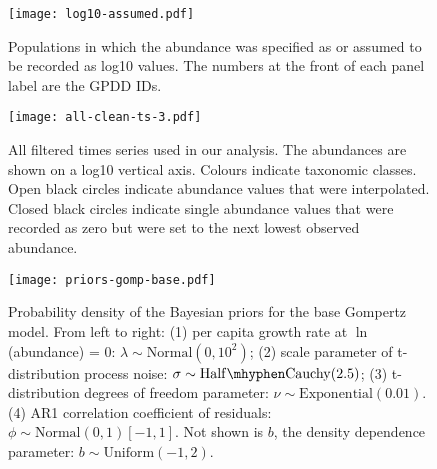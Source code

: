 \documentclass[12pt]{article}
\begin{document}

\renewcommand{\thetable}{S\arabic{table}}
\setcounter{table}{0}



\renewcommand{\thefigure}{S\arabic{figure}}
\setcounter{figure}{0}

\begin{figure}[htbp]
\begin{center}
\texttt{[image: log10-assumed.pdf]} \caption{Populations in which the abundance was specified as or assumed to be recorded as log10 values. The numbers at the front of each panel label are the GPDD IDs.}
    \label{fig:log10-assumed}
\end{center}
\end{figure}

\begin{figure}[htbp]
\begin{center}
\texttt{[image: all-clean-ts-3.pdf]} \caption{All filtered times series used in our analysis. The abundances are shown on a log10 vertical axis. Colours indicate taxonomic classes. Open black circles indicate abundance values that were interpolated. Closed black circles indicate single abundance values that were recorded as zero but were set to the next lowest observed abundance.}
    \label{fig:all-ts}
\end{center}
\end{figure}

\clearpage

\begin{figure}[htbp]
\begin{center}
\texttt{[image: priors-gomp-base.pdf]} \caption{Probability
  density of the Bayesian priors for the base Gompertz model. From left to right: (1) per capita growth
  rate at $\ln$(abundance) = $0$: $\lambda \sim \mathrm{Normal}(0, 10^2)$; (2) scale
  parameter of t-distribution process noise: $\sigma \sim \mathrm{Half\mhyphen
    Cauchy} (2.5)$; (3) t-distribution degrees of freedom parameter: $\nu \sim
  \mathrm{Exponential}(0.01)$. (4) AR1 correlation coefficient of residuals: $\phi \sim \mathrm{Normal}(0, 1)[-1, 1]$. Not shown is $b$, the density dependence
  parameter: $b \sim \mathrm{Uniform}(-1, 2)$.}
  \label{fig:priors}
\end{center}
\end{figure}

\clearpage
\end{document}
